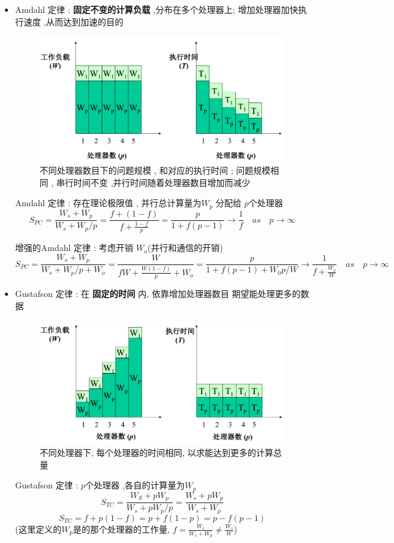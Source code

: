 \documentclass[UTF8,a4paper]{ctexart}
\begin{document}
  \begin{itemize}
    \item Amdahl 定律 : \textbf{固定不变的计算负载}  ,分布在多个处理器上; 增加处理器加快执行速度 ,从而达到加速的目的
    \begin{figure}[H]
      \centering
      \includegraphics[scale = 0.3]{assets/ParallelComputing_f5c40.png}
      \caption{不同处理器数目下的问题规模 , 和对应的执行时间 ; 问题规模相同 , 串行时间不变 ,并行时间随着处理器数目增加而减少}
    \end{figure}
    Amdahl 定律 : 存在理论极限值 , 并行总计算量为$W_p$ 分配给 $p$个处理器
    \[S_{PC} = \frac{W_s + W_p}{W_s + W_p / p} = \frac{f + (1 - f)}{f + \frac{1 - f}{p}} = \frac{p}{1 + f(p - 1)} \to \frac{1}{f} \quad as\quad p \to \infty\]

    增强的Amdahl 定律 : 考虑开销 $W_o$(并行和通信的开销)
    \[S_{PC} = \frac{W_s + W_p}{W_s + W_p / p + W_o} = \frac{W}{fW + \frac{W(1 - f)}{p} + W_o} = \frac{p}{1 + f(p - 1) + W_0p / W} \to \frac{1}{f + \frac{W_o}{W}} \quad as \quad p \to \infty\]

    \item Gustafson 定律 : 在 \textbf{固定的时间} 内, 依靠增加处理器数目 期望能处理更多的数据
    \begin{figure}[H]
      \centering
      \includegraphics[scale = 0.3]{assets/ParallelComputing_4eeb1.png}
      \caption{不同处理器下, 每个处理器的时间相同, 以求能达到更多的计算总量}
    \end{figure}
    Gustafson 定律 : $p$个处理器 ,各自的计算量为$W_p$
    \[S_{TC} = \frac{W_S + pW_p}{W_s + pW_p / p} = \frac{W_s + pW_p}{W_s + W_p} \]
    \[S_{TC} = f + p(1 - f) = p + f(1 - p) = p - f(p - 1)\]
     (这里定义的$W_p$是的那个处理器的工作量, $f = \frac{W_s}{W_s + W_p} \neq \frac{W_s}{W}$)


\end{itemize}
\end{document}
